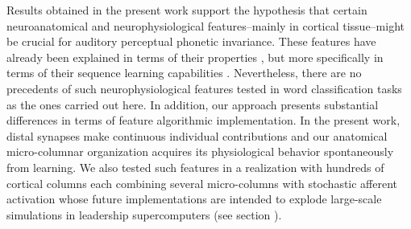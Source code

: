 \documentclass[10pt,letterpaper]{article}
\begin{document}
Results obtained in the present work support the hypothesis that certain neuroanatomical and neurophysiological features--mainly in cortical tissue--might be crucial for auditory perceptual phonetic invariance.
These features have already been explained in terms of their properties \cite{hawkins_2016}, but more specifically in terms of their sequence learning capabilities \cite{cui_2016}.
Nevertheless, there are no precedents of such neurophysiological features tested in word classification tasks as the ones carried out here. In addition, our approach presents substantial differences in terms of feature algorithmic implementation. In the present work, distal synapses make continuous individual contributions and our anatomical micro-columnar organization acquires its physiological behavior spontaneously from learning. We also tested such features in a realization with hundreds of cortical columns each combining several micro-columns with stochastic afferent activation whose future implementations are intended to explode large-scale simulations in leadership supercomputers (see section ).




\end{document}
